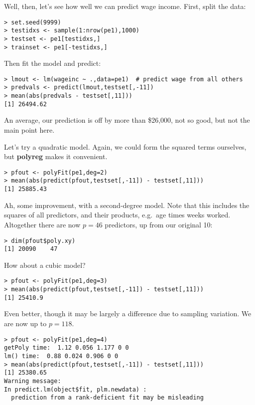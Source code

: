 Well, then, let's see how well we can predict wage income. First, split
the data:

\begin{lstlisting}
> set.seed(9999)
> testidxs <- sample(1:nrow(pe1),1000)
> testset <- pe1[testidxs,]
> trainset <- pe1[-testidxs,]
\end{lstlisting}

Then fit the model and predict:

\begin{lstlisting}
> lmout <- lm(wageinc ~ .,data=pe1)  # predict wage from all others
> predvals <- predict(lmout,testset[,-11])
> mean(abs(predvals - testset[,11]))
[1] 26494.62
\end{lstlisting}

An average, our prediction is off by more than \$26,000, not so good,
but not the main point here.

Let's try a quadratic model.  Again, we could form the squared terms
ourselves, but \textbf{polyreg} makes it convenient.

\begin{lstlisting}
> pfout <- polyFit(pe1,deg=2)
> mean(abs(predict(pfout,testset[,-11]) - testset[,11]))
[1] 25885.43
\end{lstlisting}

Ah, some improvement, with a second-degree model.  Note that this
includes the squares of all predictors, and their products, e.g.\ age
times weeks worked.  Altogether there are now $p = 46$ predictors, up
from our original 10:

\begin{lstlisting}
> dim(pfout$poly.xy)
[1] 20090    47
\end{lstlisting}

How about a cubic model? 

\begin{lstlisting}
> pfout <- polyFit(pe1,deg=3)
> mean(abs(predict(pfout,testset[,-11]) - testset[,11]))
[1] 25410.9
\end{lstlisting}

Even better, though it may be largely a difference due to sampling
variation.  We are now up to $p = 118$.

\begin{lstlisting}
> pfout <- polyFit(pe1,deg=4)
getPoly time:  1.12 0.056 1.177 0 0 
lm() time:  0.88 0.024 0.906 0 0 
> mean(abs(predict(pfout,testset[,-11]) - testset[,11]))
[1] 25380.65
Warning message:
In predict.lm(object$fit, plm.newdata) :
  prediction from a rank-deficient fit may be misleading
\end{lstlisting}

